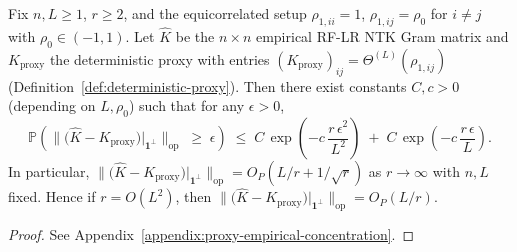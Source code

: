 \begin{theorem}\label{thm:equicorrelated-op-bound}
Fix \(n,L\ge 1\), \(r\ge 2\), and the equicorrelated setup \(\rho_{1,ii}=1\), \(\rho_{1,ij}=\rho_0\) for \(i\neq j\) with \(\rho_0\in(-1,1)\). Let \(\hat{K}\) be the \(n\times n\) empirical RF-LR NTK Gram matrix and \(K_{\mathrm{proxy}}\) the deterministic proxy with entries \((K_{\mathrm{proxy}})_{ij}=\Theta^{(L)}(\rho_{1,ij})\) (Definition~\ref{def:deterministic-proxy}). Then there exist constants \(C,c>0\) (depending on \(L,\rho_0\)) such that for any \(\epsilon>0\),
\[
\mathbb{P}\!\left(\bigl\|\bigl(\hat{K}-K_{\mathrm{proxy}}\bigr)\big|_{\mathbf{1}^\perp}\bigr\|_{\mathrm{op}}\;\ge\; \epsilon\right)
\;\le\; C\,\exp\!\left(-c\,\frac{r\,\epsilon^2}{L^2}\right)\;+\; C\,\exp\!\left(-c\,\frac{r\,\epsilon}{L}\right).
\]
In particular, \(\bigl\|\bigl(\hat{K}-K_{\mathrm{proxy}}\bigr)\big|_{\mathbf{1}^\perp}\bigr\|_{\mathrm{op}}=O_P(L/r+1/\sqrt{r})\) as \(r\to\infty\) with \(n,L\) fixed. Hence if \(r=O(L^2)\), then \(\bigl\|\bigl(\hat{K}-K_{\mathrm{proxy}}\bigr)\big|_{\mathbf{1}^\perp}\bigr\|_{\mathrm{op}}=O_P(L/r)\).
\end{theorem}
\begin{proof}
See Appendix~\ref{appendix:proxy-empirical-concentration}.
\end{proof}

